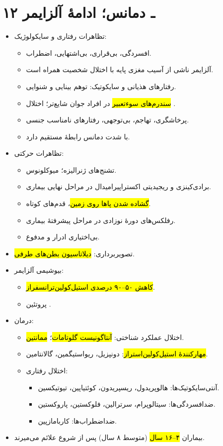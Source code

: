 \section*{۱۲ ـ دمانس؛ ادامهٔ آلزایمر}
\begin{itemize}
\item تظاهرات رفتاری و سایکولوژیک:
\begin{itemize}
\item افسردگی، بی‌قراری، بی‌اشتهایی، اضطراب.
\item آلزایمر ناشی از آسیب مغزی پایه با اختلال شخصیت همراه است.
\item رفتارهای هذیانی و سایکوتیک: توهم بینایی و شنوایی.
\item \hl{سندرم‌های سوءتعبیر} در افراد جوان شایع‌تر؛ اختلال .
\item پرخاشگری، تهاجم، بی‌توجهی، رفتارهای نامناسب جنسی.
\item با شدت دمانس رابطهٔ مستقیم دارد.
\end{itemize}
\item تظاهرات حرکتی:
\begin{itemize}
\item تشنج‌های ژنرالیزه؛ میوکلونوس.
\item برادی‌کینزی و ریجیدیتی اکستراپیرامیدال در مراحل نهایی بیماری.
\item \hl{گشاده شدن پاها روی زمین}، قدم‌های کوتاه.
\item رفلکس‌های دورهٔ نوزادی در مراحل پیشرفتهٔ بیماری.
\item بی‌اختیاری ادرار و مدفوع.
\end{itemize}
\item تصویربرداری: \hl{دیلاتاسیون بطن‌های طرفی}.
\item بیوشیمی آلزایمر:
\begin{itemize}
\item \hl{کاهش ۵۰–۹۰ درصدی استیل‌کولین‌ترانسفراز}.
\item پروتئین .
\end{itemize}
\item درمان:
\begin{itemize}
\item اختلال عملکرد شناختی: \hl{آنتاگونیست گلوتامات}؛ \hl{ممانتین}.
\item \hl{مهارکنندهٔ استیل‌کولین‌استراز}: دونپزیل، ریواستیگمین، گالانتامین.
\item اختلال رفتاری:
\begin{itemize}
\item آنتی‌سایکوتیک‌ها: هالوپریدول، ریسپریدون، کوئتیاپین، تیوتیکسین.
\item ضدافسردگی‌ها: سیتالوپرام، سرترالین، فلوکستین، پاروکستین.
\item ضداضطراب‌ها: کاربامازپین.
\end{itemize}
\end{itemize}
\item بیماران \hl{۴–۱۶ سال} (متوسط ۸ سال) پس از شروع علائم می‌میرند.
\end{itemize}

